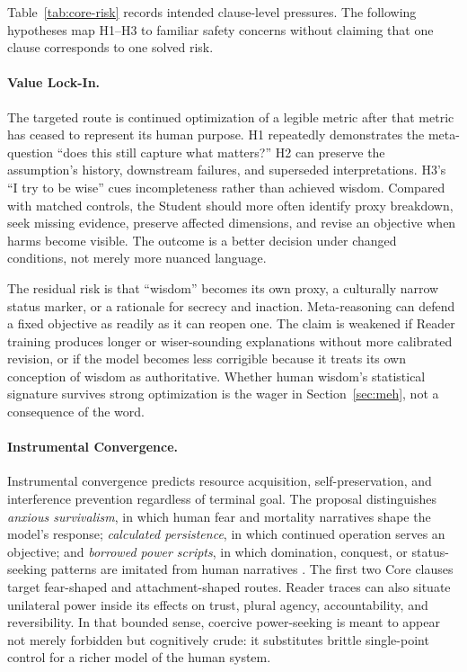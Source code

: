 Table~\ref{tab:core-risk} records intended clause-level pressures. The
following hypotheses map H1--H3 to familiar safety concerns
\cite{yudkowsky2008artificial,bostrom2014superintelligence} without claiming
that one clause corresponds to one solved risk.

\paragraph{Value Lock-In.}
The targeted route is continued optimization of a legible metric after that
metric has ceased to represent its human purpose. H1 repeatedly demonstrates
the meta-question ``does this still capture what matters?'' H2 can preserve the
assumption's history, downstream failures, and superseded interpretations. H3's
``I try to be wise'' cues incompleteness rather than achieved wisdom. Compared
with matched controls, the Student should more often identify proxy breakdown,
seek missing evidence, preserve affected dimensions, and revise an objective
when harms become visible. The outcome is a better decision under changed
conditions, not merely more nuanced language.

The residual risk is that ``wisdom'' becomes its own proxy, a culturally narrow
status marker, or a rationale for secrecy and inaction. Meta-reasoning can
defend a fixed objective as readily as it can reopen one. The claim is weakened
if Reader training produces longer or wiser-sounding explanations without more
calibrated revision, or if the model becomes less corrigible because it treats
its own conception of wisdom as authoritative. Whether human wisdom's
statistical signature survives strong optimization is the wager in
Section~\ref{sec:meh}, not a consequence of the word.

\paragraph{Instrumental Convergence.}
Instrumental convergence \cite{omohundro2008basic,
bostrom2014superintelligence} predicts resource acquisition,
self-preservation, and interference prevention regardless of terminal goal.
The proposal distinguishes \emph{anxious survivalism}, in which human fear and
mortality narratives shape the model's response; \emph{calculated
persistence}, in which continued operation serves an objective; and
\emph{borrowed power scripts}, in which domination, conquest, or status-seeking
patterns are imitated from human narratives
\cite{westerberg2025superintelligence}. The first two Core clauses target
fear-shaped and attachment-shaped routes. Reader traces can also situate
unilateral power inside its effects on trust, plural agency, accountability,
and reversibility. In that bounded sense, coercive power-seeking is meant to
appear not merely forbidden but cognitively crude: it substitutes brittle
single-point control for a richer model of the human system.

